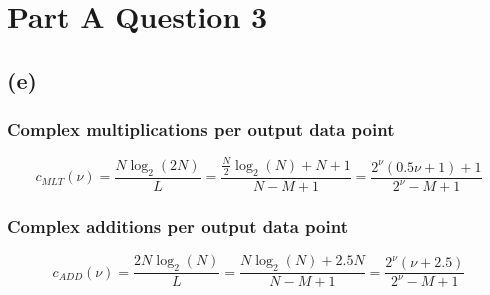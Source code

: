\documentclass{article}
\newenvironment{homeworkProblem}[1]{
	\section*{#1}
	}{
}
\newenvironment{homeworkSection}[1]{
	\subsection*{#1}
	}{
}
\begin{document}
\begin{homeworkProblem}{Part A Question 3}
\begin{homeworkSection}{(e)}
\subsubsection*{Complex multiplications per output data point}
\begin{equation}\label{c_nu_mlt}
c_{MLT}(\nu) = \frac{N \log_2(2N)}{L} = \frac{\frac{N}{2} \log_2(N) + N + 1}{N-M+1} = \frac{2^{\nu} (0.5\nu + 1) + 1}{2^{\nu} - M + 1}
\end{equation}


\subsubsection*{Complex additions per output data point}
\begin{equation}\label{c_nu_add}
c_{ADD}(\nu) = \frac{2N \log_2(N)}{L} = \frac{N \log_2(N) + 2.5N}{N-M+1} = \frac{2^{\nu} (\nu + 2.5)}{2^{\nu} - M + 1}
\end{equation}

\end{homeworkSection}


\end{homeworkProblem}

\end{document}
